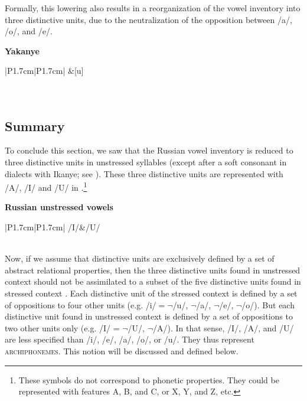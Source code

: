 \documentclass[output=paper,
modfonts,
newtxmath,
hidelinks,
]{langscibook}
\begin{document}
\noindent Formally, this lowering also results in a reorganization of the vowel inventory into three distinctive units, due to the neutralization of the opposition between /a/, /o/, and /e/.

\ea \textbf{Yakanye}\label{16}\\\medskip
\begin{tabular}{|P{1.7cm}|P{1.7cm}|}
\hline
[i]&[u]\\\hline
{}\\
\\\hline
\end{tabular}
\z


\subsection{Summary}\label{s2.4}

To conclude this section, we saw that the Russian vowel inventory is reduced to three distinctive units in unstressed syllables (except after a soft consonant in dialects with Ikanye; see ). These three distinctive units are represented with /A/, /I/ and /U/ in .\footnote{These symbols do not correspond to phonetic properties. They could be represented with features {\textbar}A{\textbar}, {\textbar}B{\textbar}, and {\textbar}C{\textbar}, or {\textbar}X{\textbar}, {\textbar}Y{\textbar}, and {\textbar}Z{\textbar}, etc.}

\ea \textbf{Russian unstressed vowels}\label{17}\\\medskip
\begin{tabular}{|P{1.7cm}|P{1.7cm}|}
\hline
/I/&/U/\\\hline
{}\\\hline
\end{tabular}
\z

\noindent Now, if we assume that distinctive units are exclusively defined by a set of abstract relational properties, then the three distinctive units found in unstressed context  should not be assimilated to a subset of the five distinctive units found in stressed context . Each distinctive unit of the stressed context is defined by a set of oppositions to four other units (e.g. /i/${}=\neg{}$/u/, $\neg$/a/, $\neg$/e/, $\neg$/o/). But each distinctive unit found in unstressed context  is defined by a set of oppositions to two other units only (e.g. /I/ = $\neg$/U/, $\neg$/A/). In that sense, /I/, /A/, and /U/ are less specified than /i/, /e/, /a/, /o/, or /u/. They thus represent \textsc{archiphonemes}. This notion will be discussed and defined below.
\end{document}
